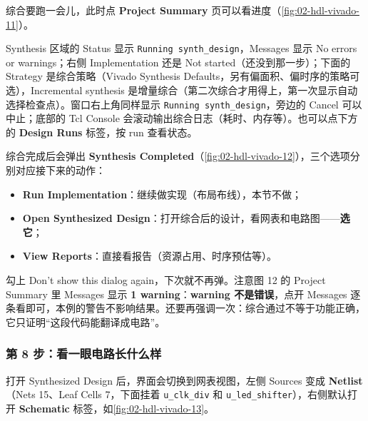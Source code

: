 综合要跑一会儿，此时点 \textbf{Project Summary} 页可以看进度（\cref{fig:02-hdl-vivado-11}）。


Synthesis 区域的 Status 显示 \texttt{Running synth\_design}，Messages 显示 No errors or warnings；右侧 Implementation 还是 Not started（还没到那一步）；下面的 Strategy 是综合策略（Vivado Synthesis Defaults，另有偏面积、偏时序的策略可选），Incremental synthesis 是增量综合（第二次综合才用得上，第一次显示自动选择检查点）。窗口右上角同样显示 \texttt{Running synth\_design}，旁边的 Cancel 可以中止；底部的 Tcl Console 会滚动输出综合日志（耗时、内存等）。也可以点下方的 \textbf{Design Runs} 标签，按 run 查看状态。

综合完成后会弹出 \textbf{Synthesis Completed}（\cref{fig:02-hdl-vivado-12}），三个选项分别对应接下来的动作：


\begin{itemize}
  \item \textbf{Run Implementation}：继续做实现（布局布线），本节不做；
  \item \textbf{Open Synthesized Design}：打开综合后的设计，看网表和电路图——\textbf{选它}；
  \item \textbf{View Reports}：直接看报告（资源占用、时序预估等）。
\end{itemize}

勾上 Don't show this dialog again，下次就不再弹。注意图 12 的 Project Summary 里 Messages 显示 \textbf{1 warning}：\textbf{warning 不是错误}，点开 Messages 逐条看即可，本例的警告不影响结果。还要再强调一次：综合通过不等于功能正确，它只证明“这段代码能翻译成电路”。

\subsubsection*{第 8 步：看一眼电路长什么样}

打开 Synthesized Design 后，界面会切换到网表视图，左侧 Sources 变成 \textbf{Netlist}（Nets 15、Leaf Cells 7，下面挂着 \texttt{u\_clk\_div} 和 \texttt{u\_led\_shifter}），右侧默认打开 \textbf{Schematic} 标签，如\cref{fig:02-hdl-vivado-13}。


